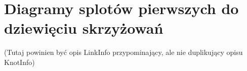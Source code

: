 
\section{Diagramy splotów pierwszych do dziewięciu skrzyżowań}
\label{sec:link_diagrams}%
(Tutaj powinien być opis LinkInfo przypominający, ale nie duplikujący opisu KnotInfo)

